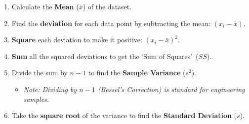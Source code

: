 
\begin{frame}
\begin{recipe}
    \begin{enumerate}
        \item Calculate the \textbf{Mean} ($\bar{x}$) of the dataset.
        \item Find the \textbf{deviation} for each data point by subtracting the mean: $(x_i - \bar{x})$.
        \item \textbf{Square} each deviation to make it positive: $(x_i - \bar{x})^2$.
        \item \textbf{Sum} all the squared deviations to get the \lq Sum of Squares\rq\ ($SS$).
        \item Divide the sum by \textbf{$n-1$} to find the \textbf{Sample Variance} ($s^2$).
        \begin{itemize}
            \item \textit{Note: Dividing by $n-1$ (Bessel's Correction) is standard for engineering samples.}
        \end{itemize}
        \item Take the \textbf{square root} of the variance to find the \textbf{Standard Deviation} ($s$).
    \end{enumerate}
\end{recipe}
\end{frame}

